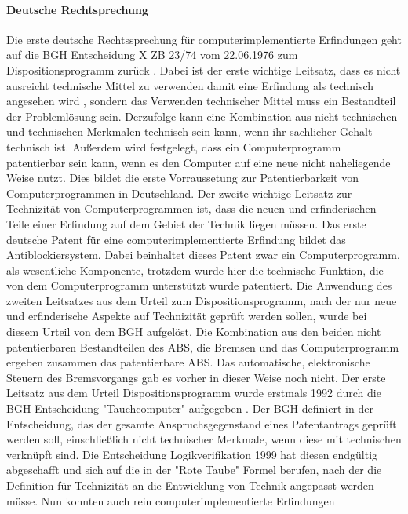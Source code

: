 \paragraph{Deutsche Rechtsprechung\label{par:deur}}
Die erste deutsche Rechtssprechung für computerimplementierte Erfindungen
geht auf die 
BGH Entscheidung X ZB 23/74 vom 22.06.1976 zum Dispositionsprogramm zurück 
\cite{BGH22061976}. 
Dabei ist der erste wichtige Leitsatz, dass es nicht ausreicht technische Mittel
zu verwenden damit eine Erfindung als technisch angesehen wird
, sondern das Verwenden technischer Mittel muss ein Bestandteil der Problemlösung sein.
Derzufolge kann eine Kombination aus nicht technischen und technischen 
Merkmalen technisch sein kann, wenn ihr sachlicher Gehalt technisch ist.
Außerdem wird festgelegt, dass ein Computerprogramm patentierbar sein
kann, wenn es den Computer auf eine neue nicht naheliegende Weise nutzt.
Dies bildet die erste Vorraussetung zur Patentierbarkeit von Computerprogrammen
in Deutschland. 
Der zweite wichtige Leitsatz zur Technizität von Computerprogrammen ist,
dass die neuen und erfinderischen Teile 
einer Erfindung auf dem Gebiet der Technik liegen müssen.
Das erste deutsche Patent für eine computerimplementierte Erfindung bildet 
das Antiblockiersystem\cite{Bundesgerichtshof13051980}.
Dabei beinhaltet dieses Patent zwar ein Computerprogramm,
als wesentliche Komponente, trotzdem wurde hier die technische Funktion,
die von dem Computerprogramm unterstützt wurde patentiert.
Die Anwendung des zweiten Leitsatzes aus dem Urteil zum Dispositionsprogramm, 
nach der nur neue und erfinderische Aspekte auf Technizität geprüft werden sollen,
wurde bei diesem Urteil von dem BGH aufgelöst. 
Die Kombination aus den beiden nicht patentierbaren Bestandteilen
des ABS, die Bremsen und das Computerprogramm ergeben zusammen 
das patentierbare ABS. 
Das automatische, elektronische Steuern des Bremsvorgangs gab es vorher 
in dieser Weise noch nicht.
Der erste Leitsatz aus dem Urteil Dispositionsprogramm wurde
erstmals 1992 durch die BGH-Entscheidung "Tauchcomputer"
aufgegeben \cite{BGH04021992}. 
Der BGH definiert in der Entscheidung, das der gesamte Anspruchsgegenstand
eines Patentantrags geprüft werden soll, 
einschließlich nicht technischer Merkmale,
wenn diese mit technischen verknüpft sind.
Die Entscheidung Logikverifikation 1999 \cite{BGH13121999}
hat diesen endgültig abgeschafft und
sich auf die in der "Rote Taube" Formel
berufen, nach der die Definition für Technizität 
an die Entwicklung von Technik angepasst werden müsse.
Nun konnten auch rein computerimplementierte Erfindungen 
